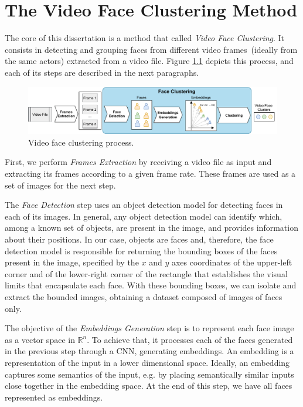 \chapter{The Video Face Clustering Method}
\label{chap:video_face_clustering}

The core of this dissertation is a method that called \emph{Video Face Clustering}.
It consists in detecting and grouping faces from different video frames~(ideally from the same actors) extracted from a video file.
Figure \ref{fig:video_face_clustering} depicts this process, and each of its steps are described in the next paragraphs.

\begin{figure}[!ht]
    \centering
    \includegraphics[width=\textwidth]{img/face_clustering/video_face_clustering.pdf}
    \caption{Video face clustering process.}
    \label{fig:video_face_clustering}
\end{figure}


First, we perform \textit{Frames Extraction} by receiving a video file as input and extracting its frames according to a given frame rate. 
These frames are used as a set of images for the next step.

The \textit{Face Detection} step uses an object detection model for detecting faces in each of its images.
In general, any object detection model can identify which, among a known set of objects, are present in the image, and provides information about their positions.
In our case, objects are faces and, therefore, the face detection model is responsible for returning the bounding boxes of the faces present in the image, specified by the $x$ and $y$ axes coordinates of the upper-left corner and of the lower-right corner of the rectangle that establishes the visual limits that encapsulate each face. 
With these bounding boxes, we can isolate and extract the bounded images, obtaining a dataset composed of images of faces only.


The objective of the \textit{Embeddings Generation} step is to represent each face image as a vector space in $\mathbb{R}^{n}$.
To achieve that, it processes each of the faces generated in the previous step through a CNN, generating embeddings. 
An embedding is a representation of the input in a lower dimensional space.
Ideally, an embedding captures some semantics of the input, e.g. by placing semantically similar inputs close together in the embedding space.
%
At the end of this step, we have all faces represented as embeddings.

